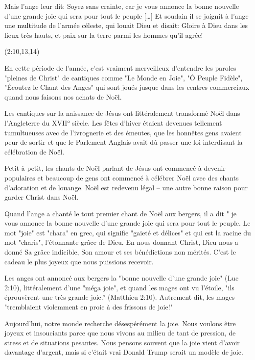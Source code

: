 

\epigraph{%
Mais l’ange leur dit: Soyez sans crainte, car je vous annonce la bonne nouvelle d’une grande joie qui sera pour tout le peuple […] Et soudain il se joignit à l'ange une multitude de l'armée céleste, qui louait Dieu et disait: Gloire à Dieu dans les lieux très hauts, et paix sur la terre parmi les hommes qu'il agrée!}{(2:10,13,14)}

En cette période de l'année, c'est vraiment merveilleux d'entendre les paroles "pleines de Christ" de cantiques comme "Le Monde en Joie", "Ô Peuple Fidèle", "Écoutez le Chant des Anges" qui sont joués jusque dans les centres commerciaux quand nous faisons nos achats de Noël.

Les cantiques sur la naissance de Jésus ont littéralement transformé Noël dans l'Angleterre du XVII° siècle. Les fêtes d'hiver étaient devenues tellement tumultueuses avec de l'ivrognerie et des émeutes, que les honnêtes gens avaient peur de sortir et que le Parlement Anglais avait dû passer une loi interdisant la célébration de Noël.

Petit à petit, les chants de Noël parlant de Jésus ont commencé à devenir populaires et beaucoup de gens ont commencé à célébrer Noël avec des chants d'adoration et de louange. Noël est redevenu légal – une autre bonne raison pour garder Christ dans Noël.

Quand l'ange a chanté le tout premier chant de Noël aux bergers, il a dit " je vous annonce la bonne nouvelle d’une grande joie qui sera pour tout le peuple. Le mot "joie" est "chara" en grec, qui signifie "gaieté et délices" et qui est la racine du mot "charis", l'étonnante grâce de Dieu. En nous donnant Christ, Dieu nous a donné Sa grâce indicible, Son amour et ses bénédictions non mérités. C'est le cadeau le plus joyeux que nous puissions recevoir.

Les anges ont annoncé aux bergers la "bonne nouvelle d'une grande joie" (Luc 2:10), littéralement d'une "méga joie", et quand les mages ont vu l'étoile, "ils éprouvèrent une très grande joie.” (Matthieu 2:10). Autrement dit, les mages "tremblaient violemment en proie à des frissons de joie!"

Aujourd'hui, notre monde recherche désespérément la joie. Nous voulons être joyeux et insouciants parce que nous vivons au milieu de tant de pression, de stress et de situations pesantes. Nous pensons souvent que la joie vient d'avoir davantage d'argent, mais si c'était vrai Donald Trump serait un modèle de joie.

